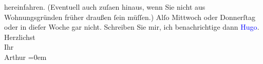                hereinfahren. (Eventuell auch zuſa{\geminationm}en hinaus, wenn Sie
               nicht aus Wohnungsgründen früher draußen ſein müſſen.)\pend
           \pstart
           Alſo Mittwoch oder Donnerſtag oder in dieſer Woche gar
               nicht.\pend
           \pstart
           {\pb}Schreiben Sie mir, ich benachrichtige dann \textcolor{blue}{Hugo}{}\ledrightnote{\textcolor{blue}{Hugo von Hofmannsthal}}.\pend
           \pstart
           Herzlichst{\\[\baselineskip]}Ihr{\\[\baselineskip]}\spacefill\mbox{Arthur}\pend
           \leftskip=0em{}\endnumbering{}  
      